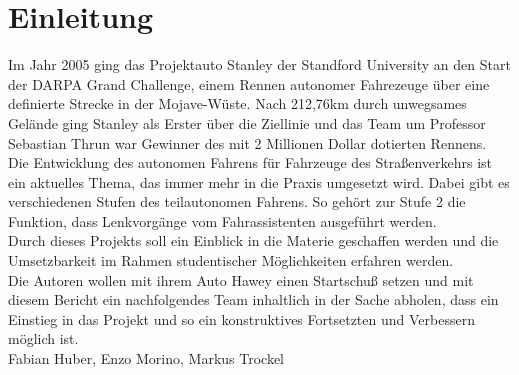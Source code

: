 \section{Einleitung}
Im Jahr 2005 ging das Projektauto Stanley der Standford University an den Start
der DARPA Grand Challenge, einem Rennen autonomer Fahrezeuge über eine
definierte Strecke in der Mojave-Wüste. Nach 212,76km durch unwegsames Gelände
ging Stanley als Erster über die Ziellinie und das Team um Professor Sebastian
Thrun war Gewinner des mit 2 Millionen Dollar dotierten Rennens.\\
Die Entwicklung des autonomen Fahrens für Fahrzeuge des Straßenverkehrs ist ein
aktuelles Thema, das immer mehr in die Praxis umgesetzt wird. Dabei gibt es
verschiedenen Stufen des teilautonomen Fahrens. So gehört zur Stufe 2 die
Funktion, dass Lenkvorgänge vom Fahrassistenten ausgeführt werden.\\
Durch dieses Projekts soll ein Einblick in die Materie geschaffen
werden und die Umsetzbarkeit im Rahmen studentischer Möglichkeiten erfahren
werden.\\
Die Autoren wollen mit ihrem Auto Hawey einen Startschuß setzen und mit diesem
Bericht ein nachfolgendes Team inhaltlich in der Sache abholen, dass ein
Einstieg in das Projekt und so ein konstruktives Fortsetzten und Verbessern 
möglich ist.\\

Fabian Huber, Enzo Morino, Markus Trockel
